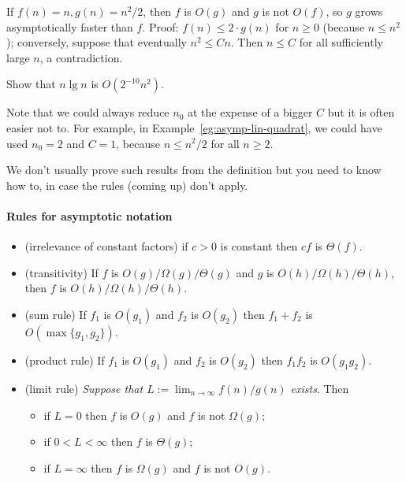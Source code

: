 \begin{Example} 
\label{eg:asymp-lin-quadrat}
If $f(n) = n, g(n) = n^2/2$, then $f$ is $O(g)$ and $g$ is not
$O(f)$, so $g$ grows asymptotically faster than $f$. Proof: 
$f(n) \leq 2 \cdot g(n)$ for $n\geq 0$ (because $n\leq n^2$); conversely, suppose 
that eventually $n^2 \leq Cn$. Then $n \leq C$ for all sufficiently large $n$, 
a contradiction.
\end{Example}

\begin{Boxample}[4]
Show that $n \lg n$ is $O(2^{-10} n^2)$.
\end{Boxample}

Note that we could always reduce $n_0$ at the expense of a bigger $C$ but 
it is often easier not to. For example, in Example~\ref{eg:asymp-lin-quadrat}, we could have used 
$n_0 = 2$ and $C = 1$, because $n\leq n^2/2$ for all $n\geq 2$.

We don't usually prove such results from the definition but you
need to know how to, in case the rules (coming up) don't apply.

\paragraph{Rules for asymptotic notation}
\begin{itemize}
\item (irrelevance of constant factors) if $c > 0$ is constant then $cf$ is $\Theta(f)$.
\item (transitivity) If $f$ is $O(g)/\Omega(g)/\Theta(g)$ and $g$ is 
$O(h)/\Omega(h)/\Theta(h)$, then $f$ is $O(h)/\Omega(h)/\Theta(h)$.
\item (sum rule) If $f_1$ is $O(g_1)$ and $f_2$ is $O(g_2)$ then $f_1 + f_2$ is 
$O(\max\{g_1, g_2\})$.
\item (product rule) If $f_1$ is $O(g_1)$ and $f_2$ is $O(g_2)$ then $f_1 f_2$ 
is $O(g_1 g_2)$.
\item (limit rule) \emph{Suppose that $L:=\lim_{n\to\infty} f(n)/g(n)$ exists}. 
Then
\begin{itemize}
\item if $L = 0$ then $f$ is $O(g)$ and $f$ is not $\Omega(g)$;
\item if $0 < L < \infty$ then $f$ is $\Theta(g)$;
\item if $L = \infty$ then $f$ is $\Omega(g)$ and $f$ is not $O(g)$.
\end{itemize}
\end{itemize}

